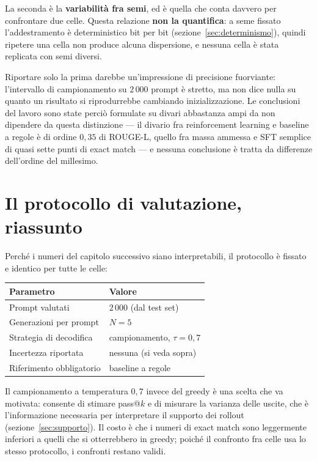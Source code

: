 La seconda è la \textbf{variabilità fra semi}, ed è quella che conta davvero per
confrontare due celle. Questa relazione \textbf{non la quantifica}: a seme
fissato l'addestramento è deterministico bit per bit
(sezione~\ref{sec:determinismo}), quindi ripetere una cella non produce alcuna
dispersione, e nessuna cella è stata replicata con semi diversi.

Riportare solo la prima darebbe un'impressione di precisione fuorviante:
l'intervallo di campionamento su $2\,000$ prompt è stretto, ma non dice nulla su
quanto un risultato si riprodurrebbe cambiando inizializzazione. Le conclusioni
del lavoro sono state perciò formulate su divari abbastanza ampi da non
dipendere da questa distinzione --- il divario fra reinforcement learning e
baseline a regole è di ordine $0{,}35$ di ROUGE-L, quello fra massa ammessa e
SFT semplice di quasi sette punti di exact match --- e nessuna conclusione è
tratta da differenze dell'ordine del millesimo.

\section{Il protocollo di valutazione, riassunto}

Perché i numeri del capitolo successivo siano interpretabili, il protocollo è
fissato e identico per tutte le celle:

\begin{center}
\begin{tabular}{ll}
\toprule
Parametro & Valore \\
\midrule
Prompt valutati & $2\,000$ (dal test set) \\
Generazioni per prompt & $N = 5$ \\
Strategia di decodifica & campionamento, $\tau = 0{,}7$ \\
Incertezza riportata & nessuna (si veda sopra) \\
Riferimento obbligatorio & baseline a regole \\
\bottomrule
\end{tabular}
\end{center}

Il campionamento a temperatura $0{,}7$ invece del greedy è una scelta che va
motivata: consente di stimare pass@$k$ e di misurare la varianza delle uscite,
che è l'informazione necessaria per interpretare il supporto dei rollout
(sezione~\ref{sec:supporto}). Il costo è che i numeri di exact match sono
leggermente inferiori a quelli che si otterrebbero in greedy; poiché il confronto
fra celle usa lo stesso protocollo, i confronti restano validi.
